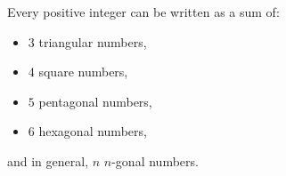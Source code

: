 Every positive integer can be written as a sum of:
\begin{itemize}
\item $3$ triangular numbers,
\item $4$ square numbers,
\item $5$ pentagonal numbers,
\item $6$ hexagonal numbers,
\end{itemize}
and in general, $n$ $n$-gonal numbers.
